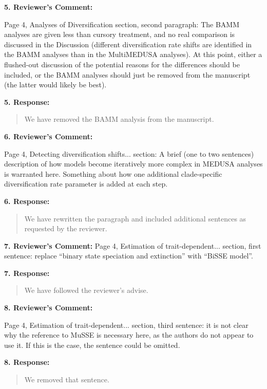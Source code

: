 \documentclass[]{article}
\begin{document}
\textbf{5. Reviewer's Comment:}

Page 4, Analyses of Diversification section, second paragraph: The BAMM analyses are given less
than cursory treatment, and no real comparison is discussed in the Discussion (different
diversification rate shifts are identified in the BAMM analyses than in the MultiMEDUSA
analyses). At this point, either a flushed-out discussion of the potential reasons for the differences
should be included, or the BAMM analyses should just be removed from the manuscript (the latter
would likely be best).


\textbf{5. Response:}

\begin{quote}
\color{blue}
We have removed the BAMM analysis from the manuscript.
\end{quote}

\textbf{6. Reviewer's Comment:}

Page 4, Detecting diversification shifts... section: A brief (one to two sentences) description of how
models become iteratively more complex in MEDUSA analyses is warranted here. Something
about how one additional clade-specific diversification rate parameter is added at each step.


\textbf{6. Response:}

\begin{quote}
\color{blue}
We have rewritten the paragraph and included additional sentences as requested
by the reviewer.
\end{quote}


\textbf{7. Reviewer's Comment:}
Page 4, Estimation of trait-dependent... section, first sentence: replace “binary state speciation and extinction” with “BiSSE model”.

\textbf{7. Response:}

\begin{quote}
\color{blue}
We have followed the reviewer's advise.
\end{quote}

\textbf{8. Reviewer's Comment:}

 Page 4, Estimation of trait-dependent... section, third sentence: it is not clear why the reference to MuSSE is necessary here, as the authors do not appear to use it. If this is the case, the sentence could be omitted.
 
 \textbf{8. Response:}

\begin{quote}
\color{blue}
We removed that sentence.
\end{quote}
\end{document}
